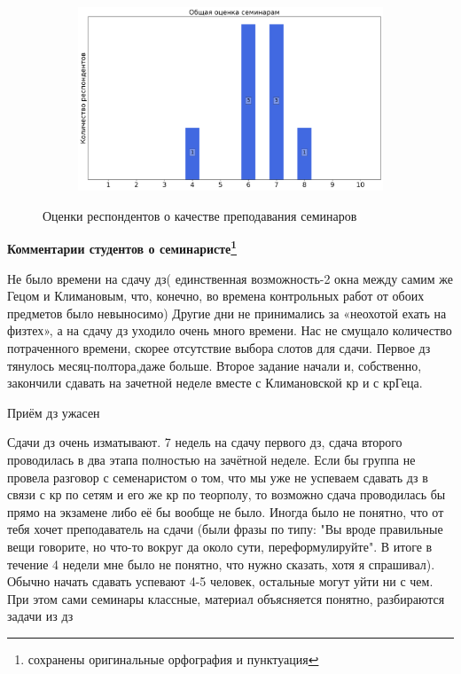 \begin{figure}[H]
\begin{subfigure}[b]{0.45\textwidth}
			\end{subfigure}
			\begin{subfigure}[b]{0.45\textwidth}
				\centering
				\includegraphics[width=\textwidth]{images/3 course/Теория поля/seminarists-marks-Гец А.В.-3.png}
			\end{subfigure}	
			\caption{Оценки респондентов о качестве преподавания семинаров}
		\end{figure}

		\textbf{Комментарии студентов о семинаристе\protect\footnote{сохранены оригинальные орфография и пунктуация}}
            \begin{commentbox} 
                Не было времени на сдачу дз( единственная возможность-2 окна между самим же Гецом и Климановым, что, конечно, во времена контрольных работ от обоих предметов было невыносимо) Другие дни не принимались за «неохотой ехать на физтех», а на сдачу дз уходило очень много времени. Нас не смущало количество потраченного времени, скорее отсутствие выбора слотов для сдачи. Первое дз тянулось месяц-полтора,даже больше. Второе задание начали и, собственно, закончили сдавать на зачетной неделе вместе с Климановской кр и с крГеца.  
            \end{commentbox} 
        
            \begin{commentbox} 
                Приём дз ужасен 
            \end{commentbox} 
        
            \begin{commentbox} 
                Сдачи дз очень изматывают. 7 недель на сдачу первого дз, сдача второго проводилась в два этапа полностью на зачётной неделе. Если бы группа не провела разговор с семенаристом о том, что мы уже не успеваем сдавать дз в связи с кр по сетям и его же кр по теорполу, то возможно сдача проводилась бы прямо на экзамене либо её бы вообще не было. Иногда было не понятно, что от тебя хочет преподаватель на сдачи (были фразы по типу: "Вы вроде правильные вещи говорите, но что-то вокруг да около сути, переформулируйте". В итоге в течение 4 недели мне было не понятно, что нужно сказать, хотя я спрашивал). Обычно начать сдавать успевают 4-5 человек, остальные могут уйти ни с чем. При этом сами семинары классные, материал объясняется понятно, разбираются задачи из дз 
            \end{commentbox} 
        
